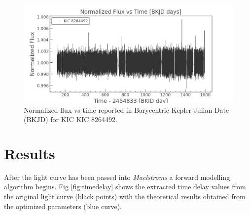 \documentclass[]{article}
\begin{document}
\begin{figure}[H]
    \centering
    \includegraphics[width=1\linewidth]{Lightcurve.png}
    \caption{Normalized flux vs time reported in Barycentric Kepler Julian Date (BKJD) for KIC KIC 8264492.}
    \label{fig:Lightcurve}
\end{figure}


\section{Results}
After the light curve has been passed into \textit{Maelstroms} a forward modelling algorithm begins. 
Fig \ref{fig:timedelay} shows the extracted time delay values from the original light curve (black points) with the theoretical results obtained from the optimized parameters (blue curve).
\end{document}
